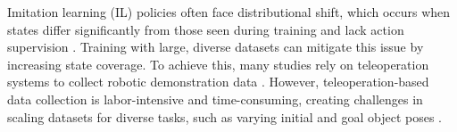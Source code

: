 Imitation learning (IL) policies often face distributional shift, which occurs when states differ significantly from those seen during training and lack action supervision \cite{mandlekar2022matters}. Training with large, diverse datasets can mitigate this issue by increasing state coverage.
To achieve this, many studies rely on teleoperation systems to collect robotic demonstration data \cite{handa2020dexpilot, heo2023furniturebench, mandlekar2018roboturk, mandlekar2019scaling, mandlekar2020human, stepputtis2022system, Zhao-RSS-23}. However, teleoperation-based data collection is labor-intensive and time-consuming, creating challenges in scaling datasets for diverse tasks, such as varying initial and goal object poses \cite{brohan2022rt, heo2023furniturebench, jang2022bc, xiang2019task, yang2021trail, dalal2023imitating}.

